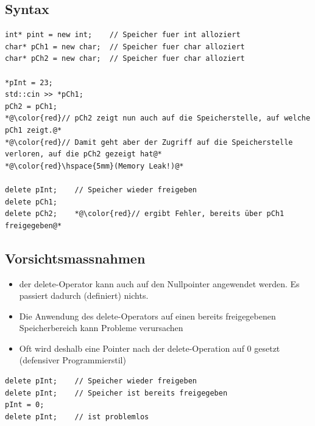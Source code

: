\subsection{Syntax}
\label{sec:Dynamische Speicherverwaltung: Syntax}
\noindent
\begin{minipage}{\linewidth}
\begin{lstlisting}
int* pint = new int;	// Speicher fuer int alloziert
char* pCh1 = new char;	// Speicher fuer char alloziert
char* pCh2 = new char;	// Speicher fuer char alloziert

*pInt = 23;
std::cin >> *pCh1;
pCh2 = pCh1;
*@\color{red}// pCh2 zeigt nun auch auf die Speicherstelle, auf welche pCh1 zeigt.@*
*@\color{red}// Damit geht aber der Zugriff auf die Speicherstelle verloren, auf die pCh2 gezeigt hat@*
*@\color{red}\hspace{5mm}(Memory Leak!)@*

delete pInt;	// Speicher wieder freigeben
delete pCh1;
delete pCh2;	*@\color{red}// ergibt Fehler, bereits über pCh1 freigegeben@*
\end{lstlisting}
\end{minipage}

\subsection{Vorsichtsmassnahmen}
\label{sec:Dynamische Speicherverwaltung: Vorsichtsmassnahmen}
\begin{itemize}
	\item der delete-Operator kann auch auf den Nullpointer angewendet werden. Es passiert dadurch (definiert) nichts.
	\item Die Anwendung des delete-Operators auf einen  bereits freigegebenen Speicherbereich kann Probleme verursachen
	\item Oft wird deshalb eine Pointer nach der delete-Operation auf 0 gesetzt (defensiver Programmierstil)
\end{itemize}
\noindent
\begin{minipage}{\linewidth}
\begin{lstlisting}
delete pInt;	// Speicher wieder freigeben
delete pInt;	// Speicher ist bereits freigegeben
pInt = 0;
delete pInt;	// ist problemlos
\end{lstlisting}
\end{minipage}

